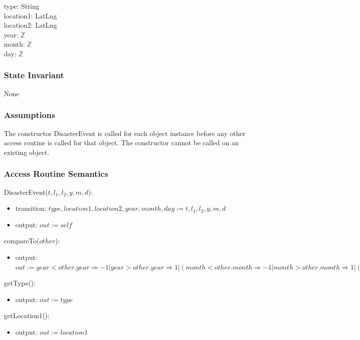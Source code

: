 \documentclass[12pt]{article}
\begin{document}
type: String \\
location1: LatLng \\
location2: LatLng \\
year: $\mathbb{Z}$ \\
month: $\mathbb{Z}$ \\
day: $\mathbb{Z}$ \\

\subsubsection {State Invariant}

None

\subsubsection {Assumptions}

The constructor DisasterEvent is called for each object instance before any other access routine is called for that object. The constructor cannot be called on an existing object.

\subsubsection {Access Routine Semantics}

DisasterEvent($t, l_1, l_2, y, m, d$):
\begin{itemize}
\item transition: $type, location1, location2, year, month, day := t, l_1, l_2, y, m, d$
\item output: $out := \mathit{self}$
\end{itemize}

\noindent compareTo($other$):
\begin{itemize}
\item output: $out := year < other.year \Rightarrow -1 | year > other.year \Rightarrow 1 | (month < other.month \Rightarrow -1 | month > other.month \Rightarrow 1 | (day < other.day \Rightarrow -1 | day > other.day \Rightarrow 1 | 0))$
\end{itemize}

\noindent getType():
\begin{itemize}
\item output: $out := type$
\end{itemize}

\noindent getLocation1():
\begin{itemize}
\item output: $out := location1$
\end{itemize}
\end{document}
